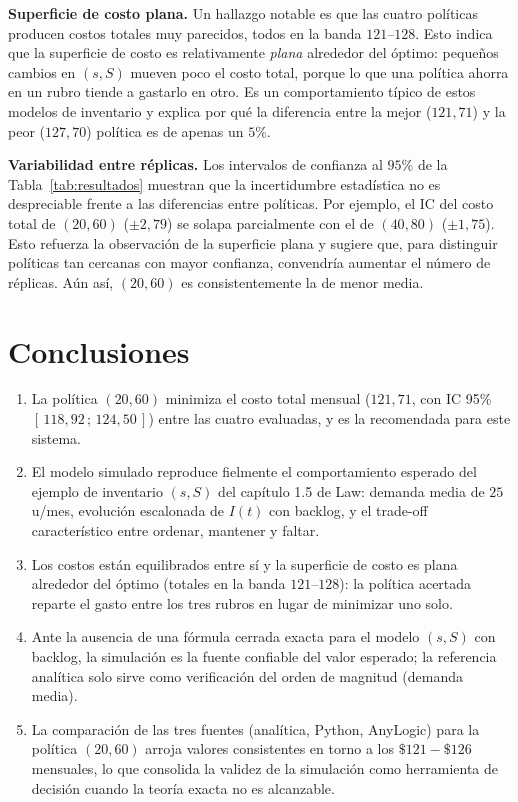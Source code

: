 \documentclass[11pt]{article}
\begin{document}
\textbf{Superficie de costo plana.} Un hallazgo notable es que las cuatro
pol\'iticas producen costos totales muy parecidos, todos en la banda
$121$--$128$. Esto indica que la superficie de costo es relativamente
\emph{plana} alrededor del \'optimo: peque\~nos cambios en $(s, S)$ mueven poco
el costo total, porque lo que una pol\'itica ahorra en un rubro tiende a
gastarlo en otro. Es un comportamiento t\'ipico de estos modelos de inventario y
explica por qu\'e la diferencia entre la mejor ($121{,}71$) y la peor
($127{,}70$) pol\'itica es de apenas un $5\%$.

\textbf{Variabilidad entre r\'eplicas.} Los intervalos de confianza al $95\%$
de la Tabla~\ref{tab:resultados} muestran que la incertidumbre estad\'istica
no es despreciable frente a las diferencias entre pol\'iticas. Por ejemplo, el
IC del costo total de $(20, 60)$ ($\pm 2{,}79$) se solapa parcialmente con el de
$(40, 80)$ ($\pm 1{,}75$). Esto refuerza la observaci\'on de la superficie plana
y sugiere que, para distinguir pol\'iticas tan cercanas con mayor confianza,
convendr\'ia aumentar el n\'umero de r\'eplicas. A\'un as\'i, $(20, 60)$ es
consistentemente la de menor media.

\section{Conclusiones}

\begin{enumerate}
  \item La pol\'itica $(20, 60)$ minimiza el costo total mensual ($121{,}71$,
    con IC 95\% $[\,118{,}92\,;\,124{,}50\,]$) entre las cuatro evaluadas, y es
    la recomendada para este sistema.
  \item El modelo simulado reproduce fielmente el comportamiento esperado del
    ejemplo de inventario $(s, S)$ del cap\'itulo 1.5 de Law: demanda media de
    $25$ u/mes, evoluci\'on escalonada de $I(t)$ con backlog, y el trade-off
    caracter\'istico entre ordenar, mantener y faltar.
  \item Los costos est\'an equilibrados entre s\'i y la superficie de costo es
    plana alrededor del \'optimo (totales en la banda $121$--$128$): la
    pol\'itica acertada reparte el gasto entre los tres rubros en lugar de
    minimizar uno solo.
  \item Ante la ausencia de una f\'ormula cerrada exacta para el modelo
    $(s, S)$ con backlog, la simulaci\'on es la fuente confiable del valor
    esperado; la referencia anal\'itica solo sirve como verificaci\'on del
    orden de magnitud (demanda media).
  \item La comparaci\'on de las tres fuentes (anal\'itica, Python, AnyLogic)
    para la pol\'itica $(20, 60)$ arroja valores consistentes en torno a los
    $\$121-\$126$ mensuales, lo que consolida la validez de la simulaci\'on 
    como herramienta de decisi\'on cuando la teor\'ia exacta no es alcanzable.
\end{enumerate}
\end{document}
